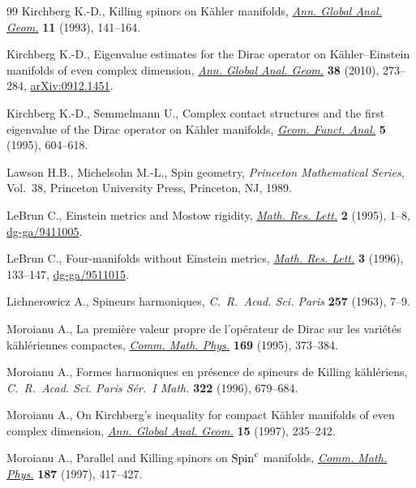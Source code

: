\begin{thebibliography}{99}
Kirchberg K.-D., Killing spinors on {K}\"ahler manifolds, \href{http://dx.doi.org/10.1007/BF00773453}{\textit{Ann. Global
  Anal. Geom.}} \textbf{11} (1993), 141--164.

Kirchberg K.-D., Eigenvalue estimates for the {D}irac operator on
  {K}\"ahler--{E}instein manifolds of even complex dimension, \href{http://dx.doi.org/10.1007/s10455-010-9212-6}{\textit{Ann.
  Global Anal. Geom.}} \textbf{38} (2010), 273--284, \href{http://arxiv.org/abs/0912.1451}{arXiv:0912.1451}.

Kirchberg K.-D., Semmelmann U., Complex contact structures and the f\/irst
  eigenvalue of the {D}irac operator on {K}\"ahler manifolds, \href{http://dx.doi.org/10.1007/BF01895834}{\textit{Geom.
  Funct. Anal.}} \textbf{5} (1995), 604--618.

Lawson H.B., Michelsohn M.-L., Spin geometry, \textit{Princeton Mathematical
  Series}, Vol.~38, Princeton University Press, Princeton, NJ, 1989.

LeBrun C., Einstein metrics and {M}ostow rigidity, \href{http://dx.doi.org/10.4310/MRL.1995.v2.n1.a1}{\textit{Math. Res. Lett.}}
  \textbf{2} (1995), 1--8, \href{http://arxiv.org/abs/dg-ga/9411005}{dg-ga/9411005}.

LeBrun C., Four-manifolds without {E}instein metrics, \href{http://dx.doi.org/10.4310/MRL.1996.v3.n2.a1}{\textit{Math. Res. Lett.}}
  \textbf{3} (1996), 133--147, \href{http://arxiv.org/abs/dg-ga/9511015}{dg-ga/9511015}.

Lichnerowicz A., Spineurs harmoniques, \textit{C.~R.~Acad. Sci. Paris}
  \textbf{257} (1963), 7--9.

Moroianu A., La premi\`ere valeur propre de l'op\'erateur de {D}irac sur les
  vari\'et\'es k\"ahl\'eriennes compactes, \href{http://dx.doi.org/10.1007/BF02099477}{\textit{Comm. Math. Phys.}}
  \textbf{169} (1995), 373--384.

Moroianu A., Formes harmoniques en pr\'esence de spineurs de {K}illing
  k\"ahl\'eriens, \textit{C.~R.~Acad. Sci. Paris S\'er.~I Math.} \textbf{322}
  (1996), 679--684.

Moroianu A., On {K}irchberg's inequality for compact {K}\"ahler manifolds of
  even complex dimension, \href{http://dx.doi.org/10.1023/A:1006543304443}{\textit{Ann. Global Anal. Geom.}} \textbf{15} (1997),
  235--242.

Moroianu A., Parallel and {K}illing spinors on {${\rm Spin}^c$} manifolds,
  \href{http://dx.doi.org/10.1007/s002200050142}{\textit{Comm. Math. Phys.}} \textbf{187} (1997), 417--427.


\end{thebibliography}
